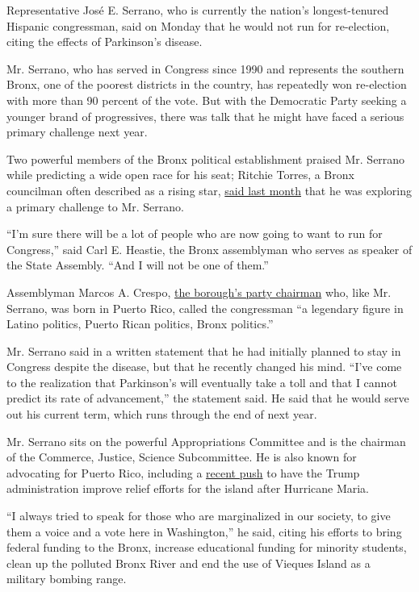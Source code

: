 Representative José E. Serrano, who is currently the nation's
longest-tenured Hispanic congressman, said on Monday that he would not
run for re-election, citing the effects of Parkinson's disease.

Mr. Serrano, who has served in Congress since 1990 and represents the
southern Bronx, one of the poorest districts in the country, has
repeatedly won re-election with more than 90 percent of the vote. But
with the Democratic Party seeking a younger brand of progressives, there
was talk that he might have faced a serious primary challenge next year.

Two powerful members of the Bronx political establishment praised Mr.
Serrano while predicting a wide open race for his seat; Ritchie Torres,
a Bronx councilman often described as a rising star,
\href{https://www.nytimes3xbfgragh.onion/2019/02/14/nyregion/ny-congress-primaries-2020.html}{said
last month} that he was exploring a primary challenge to Mr. Serrano.

``I'm sure there will be a lot of people who are now going to want to
run for Congress,'' said Carl E. Heastie, the Bronx assemblyman who
serves as speaker of the State Assembly. ``And I will not be one of
them.''

Assemblyman Marcos A. Crespo,
\href{http://bronxdems.org/executive-board/}{the borough's party
chairman} who, like Mr. Serrano, was born in Puerto Rico, called the
congressman ``a legendary figure in Latino politics, Puerto Rican
politics, Bronx politics.''

Mr. Serrano said in a written statement that he had initially planned to
stay in Congress despite the disease, but that he recently changed his
mind. ``I've come to the realization that Parkinson's will eventually
take a toll and that I cannot predict its rate of advancement,'' the
statement said. He said that he would serve out his current term, which
runs through the end of next year.

Mr. Serrano sits on the powerful Appropriations Committee and is the
chairman of the Commerce, Justice, Science Subcommittee. He is also
known for advocating for Puerto Rico, including a
\href{https://www.nytimes3xbfgragh.onion/2017/10/09/nyregion/politicians-with-puerto-rican-roots-challenge-trump-in-push-for-aid.html}{recent
push} to have the Trump administration improve relief efforts for the
island after Hurricane Maria.

``I always tried to speak for those who are marginalized in our society,
to give them a voice and a vote here in Washington,'' he said, citing
his efforts to bring federal funding to the Bronx, increase educational
funding for minority students, clean up the polluted Bronx River and end
the use of Vieques Island as a military bombing range.

